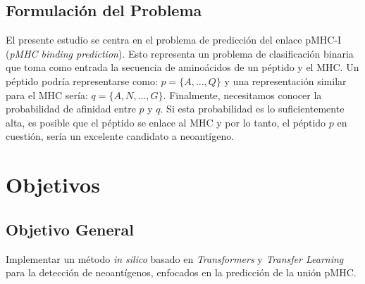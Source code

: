 \subsection{Formulación del Problema}

El presente estudio se centra en el problema de predicción del enlace pMHC-I (\textit{pMHC binding prediction}). Esto representa un problema de clasificación binaria que toma como entrada la secuencia de aminoácidos de un péptido y el MHC. Un péptido podría representarse como: $p = \{A, ..., Q\}$ y una representación similar para el MHC sería: $q = \{A, N, ..., G\}$. Finalmente, necesitamos conocer la probabilidad de afinidad entre $p$ y $q$. Si esta probabilidad es lo suficientemente alta, es posible que el péptido se enlace al MHC y por lo tanto, el péptido $p$ en cuestión, sería un excelente candidato a neoantígeno.





\section{Objetivos}
\label{sec:objetivos}

\subsection{Objetivo General}


Implementar un método \textit{in silico} basado en \textit{Transformers} y \textit{Transfer Learning} para la detección de neoantígenos, enfocados en la predicción de la unión pMHC. 

